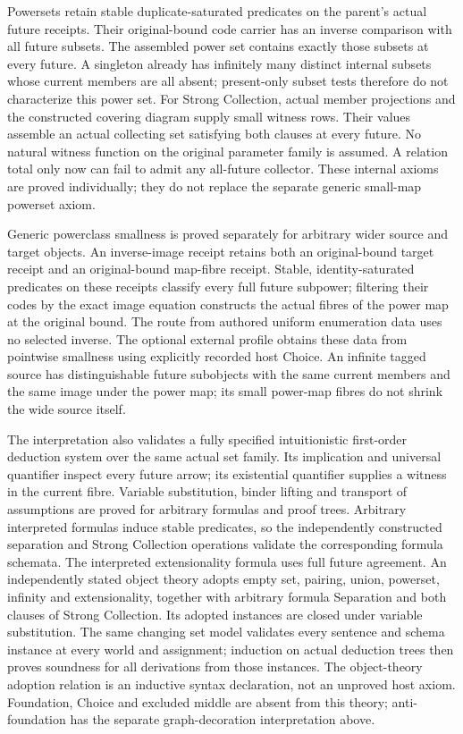 \documentclass[11pt]{article}
\theoremstyle{definition}
\theoremstyle{remark}
\begin{document}
Powersets retain stable duplicate-saturated predicates on the parent's
actual future receipts. Their original-bound code carrier has an inverse
comparison with all future subsets. The assembled power set contains
exactly those subsets at every future. A singleton already has infinitely
many distinct internal subsets whose current members are all absent;
present-only subset tests therefore do not characterize this power set.
For Strong Collection, actual member projections and the constructed
covering diagram supply small witness rows. Their values assemble an
actual collecting set satisfying both clauses at every future. No natural
witness function on the original parameter family is assumed. A relation
total only now can fail to admit any all-future collector. These internal
axioms are proved individually; they do not replace the separate generic
small-map powerset axiom.

Generic powerclass smallness is proved separately for arbitrary wider
source and target objects. An inverse-image receipt retains both an
original-bound target receipt and an original-bound map-fibre receipt.
Stable, identity-saturated predicates on these receipts classify every
full future subpower; filtering their codes by the exact image equation
constructs the actual fibres of the power map at the original bound.
The route from authored uniform enumeration data uses no selected
inverse. The optional external profile obtains these data from pointwise
smallness using explicitly recorded host Choice. An infinite tagged
source has distinguishable future subobjects with the same current
members and the same image under the power map; its small power-map
fibres do not shrink the wide source itself.

The interpretation also validates a fully specified intuitionistic
first-order deduction system over the same actual set family. Its
implication and universal quantifier inspect every future arrow; its
existential quantifier supplies a witness in the current fibre. Variable
substitution, binder lifting and transport of assumptions are proved for
arbitrary formulas and proof trees. Arbitrary interpreted formulas induce
stable predicates, so the independently constructed separation and Strong
Collection operations validate the corresponding formula schemata.
The interpreted extensionality formula uses full future agreement.
An independently stated object theory adopts empty set, pairing, union,
powerset, infinity and extensionality, together with arbitrary formula
Separation and both clauses of Strong Collection. Its adopted instances
are closed under variable substitution. The same changing set model
validates every sentence and schema instance at every world and
assignment; induction on actual deduction trees then proves soundness
for all derivations from those instances. The object-theory adoption
relation is an inductive syntax declaration, not an unproved host axiom.
Foundation, Choice and excluded middle are absent from this theory;
anti-foundation has the separate graph-decoration interpretation above.
\end{document}
